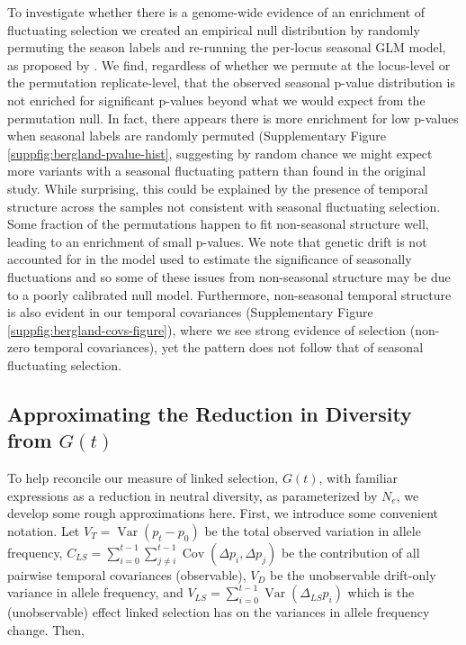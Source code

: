 \documentclass[11pt]{article}
\DeclareMathOperator{\var}{Var}
\DeclareMathOperator{\cov}{Cov}
\begin{document}
{To investigate whether there is a genome-wide evidence of an enrichment of
fluctuating selection we created an empirical null distribution by randomly
permuting the season labels and re-running the per-locus seasonal GLM model, as
proposed by \textcite{Machado2018-cs}. We find, regardless of whether we
permute at the locus-level or the permutation replicate-level, that the
observed seasonal p-value distribution \textcite{Bergland2014-ij} is not
enriched for significant p-values beyond what we would expect from the
permutation null. In fact, there appears there is more enrichment for low
p-values when seasonal labels are randomly permuted (Supplementary Figure
\ref{suppfig:bergland-pvalue-hist}, suggesting by random chance we might expect
more variants with a seasonal fluctuating pattern than found in the original
\textcite{Bergland2014-ij} study. While surprising, this could be explained by
the presence of temporal structure across the samples not consistent with
seasonal fluctuating selection. Some fraction of the permutations happen to fit
non-seasonal structure well, leading to an enrichment of small p-values.  We
note that genetic drift is not accounted for in the model used to estimate the
significance of seasonally fluctuations and so some of these issues from
non-seasonal structure may be due to a poorly calibrated null model.
Furthermore, non-seasonal temporal structure is also evident in our temporal
covariances (Supplementary Figure \ref{suppfig:bergland-covs-figure}), where we
see strong evidence of selection (non-zero temporal covariances), yet the
pattern does not follow that of seasonal fluctuating selection.  


\subsection{Approximating the Reduction in Diversity from $G(t)$}
\label{supp:reduction-approx}

To help reconcile our measure of linked selection, $G(t)$, with familiar
expressions as a reduction in neutral diversity, as parameterized by
$N_e$, we develop some rough approximations here. First, we introduce some
convenient notation. Let $V_{T} = \var(p_t - p_0)$ be the total observed
variation in allele frequency, $C_{LS} = \sum_{i=0}^{t-1} \sum_{j \ne i}^{t-1}
\cov(\Delta p_i, \Delta p_j)$ be the contribution of all pairwise temporal
covariances (observable), $V_D$ be the unobservable drift-only variance in
allele frequency, and $V_{LS} = \sum_{i=0}^{t-1} \var(\Delta_{LS} p_i)$ which is
the (unobservable) effect linked selection has on the variances in allele
frequency change. Then,

}
\end{document}
